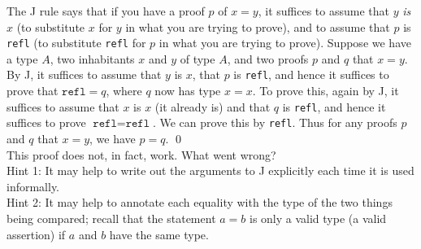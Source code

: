 \documentclass{article}
\begin{document}
\begin{itemize}
\begin{itemize}
        The J rule says that if you have a proof $p$ of $x = y$, it suffices to assume that $y$ \emph{is} $x$ (to substitute $x$ for $y$ in what you are trying to prove), and to assume that $p$ is \texttt{refl} (to substitute \texttt{refl} for $p$ in what you are trying to prove).  Suppose we have a type $A$, two inhabitants $x$ and $y$ of type $A$, and two proofs $p$ and $q$ that $x = y$.  By J, it suffices to assume that $y$ is $x$, that $p$ is \texttt{refl}, and hence it suffices to prove that $\texttt{refl} = q$, where $q$ now has type $x = x$.  To prove this, again by J, it suffices to assume that $x$ is $x$ (it already is) and that $q$ is \texttt{refl}, and hence it suffices to prove $\texttt{refl} = \texttt{refl}$.  We can prove this by \texttt{refl}.  Thus for any proofs $p$ and $q$ that $x = y$, we have $p = q$. \qed \\
        This proof does not, in fact, work.  What went wrong? \\
        Hint 1: It may help to write out the arguments to J explicitly each time it is used informally. \\
        Hint 2: It may help to annotate each equality with the type of the two things being compared; recall that the statement $a = b$ is only a valid type (a valid assertion) if $a$ and $b$ have the same type.
    \end{itemize}
\end{itemize}
\end{document}
